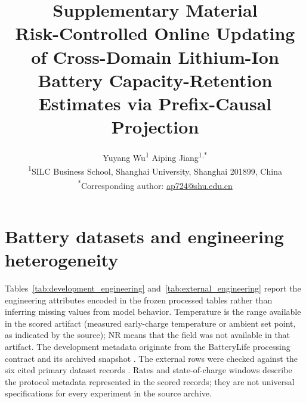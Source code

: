 \documentclass[11pt]{article}
\title{Supplementary Material\\
\large Risk-Controlled Online Updating of Cross-Domain Lithium-Ion Battery Capacity-Retention Estimates via Prefix-Causal Projection}
\author{Yuyang Wu\textsuperscript{1} \quad Aiping Jiang\textsuperscript{1,*}\\[0.35em]
\small\textsuperscript{1}SILC Business School, Shanghai University, Shanghai 201899, China\\
\small\textsuperscript{*}Corresponding author: \href{mailto:ap724@shu.edu.cn}{ap724@shu.edu.cn}}
\date{}
\begin{document}
\maketitle
\renewcommand{\thetable}{S\arabic{table}}
\renewcommand{\thefigure}{S\arabic{figure}}

\section{Battery datasets and engineering heterogeneity}

Tables~\ref{tab:development_engineering} and~\ref{tab:external_engineering} report the engineering attributes encoded in the frozen processed tables rather than inferring missing values from model behavior. Temperature is the range available in the scored artifact (measured early-charge temperature or ambient set point, as indicated by the source); NR means that the field was not available in that artifact. The development metadata originate from the BatteryLife processing contract and its archived snapshot \cite{tan2025batterylife,batterylife2026processed}. The external rows were checked against the six cited primary dataset records \cite{wheeler2025lfp,kirkaldy2024comprehensive,luh2024dataset,li2024varyingusage,lam2025calendar,stroebl2024multistage}. Rates and state-of-charge windows describe the protocol metadata represented in the scored records; they are not universal specifications for every experiment in the source archive.
\end{document}
